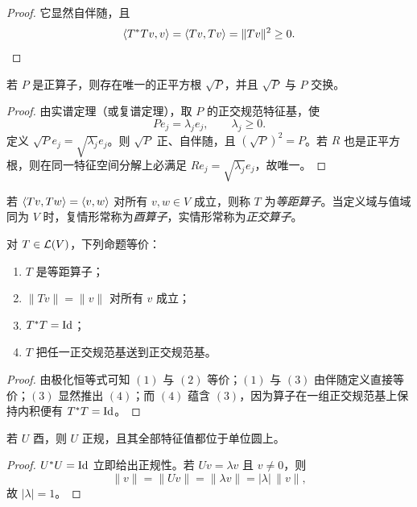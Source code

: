 \begin{proof}
它显然自伴随，且
\[
\langle T^*Tv, v \rangle=\langle Tv, Tv \rangle=\|Tv\|^2\ge 0.
\]
\end{proof}

\begin{theorem}
若 $P$ 是正算子，则存在唯一的正平方根 $\sqrt{P}$，并且 $\sqrt{P}$ 与 $P$ 交换。
\end{theorem}

\begin{proof}
由实谱定理（或复谱定理），取 $P$ 的正交规范特征基，使
\[
Pe_j=\lambda_je_j,\qquad \lambda_j\ge 0.
\]
定义 $\sqrt{P}e_j=\sqrt{\lambda_j}e_j$。则 $\sqrt{P}$ 正、自伴随，且 $(\sqrt{P})^2=P$。若 $R$ 也是正平方根，则在同一特征空间分解上必满足 $Re_j=\sqrt{\lambda_j}e_j$，故唯一。
\end{proof}

\begin{definition}
若 $\langle Tv, Tw \rangle=\langle v, w \rangle$ 对所有 $v,w\in V$ 成立，则称 $T$ 为\emph{等距算子}。当定义域与值域同为 $V$ 时，复情形常称为\emph{酉算子}，实情形常称为\emph{正交算子}。
\end{definition}

\begin{proposition}
对 $T\in\mathcal{L}(V)$，下列命题等价：
\begin{enumerate}[label=(\arabic*)]
\item $T$ 是等距算子；
\item $\|Tv\|=\|v\|$ 对所有 $v$ 成立；
\item $T^*T=\mathrm{Id}$；
\item $T$ 把任一正交规范基送到正交规范基。
\end{enumerate}
\end{proposition}

\begin{proof}
由极化恒等式可知 $(1)$ 与 $(2)$ 等价；$(1)$ 与 $(3)$ 由伴随定义直接等价；$(3)$ 显然推出 $(4)$；而 $(4)$ 蕴含 $(3)$，因为算子在一组正交规范基上保持内积便有 $T^*T=\mathrm{Id}$。
\end{proof}

\begin{corollary}
若 $U$ 酉，则 $U$ 正规，且其全部特征值都位于单位圆上。
\end{corollary}

\begin{proof}
$U^*U=\mathrm{Id}$ 立即给出正规性。若 $Uv=\lambda v$ 且 $v\neq 0$，则
\[
\|v\|=\|Uv\|=\|\lambda v\|=|\lambda|\,\|v\|,
\]
故 $|\lambda|=1$。
\end{proof}

